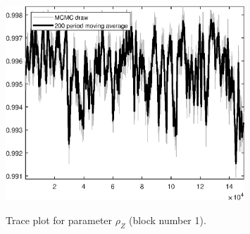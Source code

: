 \begin{figure}[H]
\centering
  \includegraphics[width=0.8\textwidth]{BRS_gen/graphs/TracePlot_rho_Z_blck_1}\\
    \caption{Trace plot for parameter ${\rho_Z}$ (block number 1).}
\end{figure}
